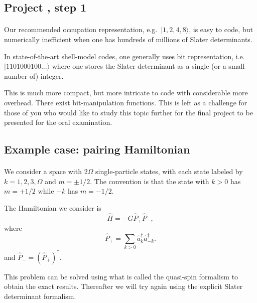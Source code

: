 \documentclass[%
twoside,                 %
final,                   %
10pt]{article}
\begin{document}
\subsection{Project , step 1}

\paragraph{}

Our recommended occupation representation, e.g.~$| 1,2,4,8 \rangle$, is 
easy to code, but numerically inefficient when one has hundreds of 
millions of Slater determinants.


In state-of-the-art shell-model codes, one generally uses bit 
representation, i.e.~$|1101000100... \rangle$ where one stores 
the Slater determinant as a single (or a small number of) integer.


This is much more compact, but more intricate to code with considerable 
more overhead. There exist 
bit-manipulation functions. 
This is left as a challenge for those of you who would like to study this topic further for the final project to be presented for the oral examination.



\subsection{Example case: pairing Hamiltonian}

\paragraph{}

We consider a space with $2\Omega$ single-particle states, with each 
state labeled by 
$k = 1, 2, 3, \Omega$ and $m = \pm 1/2$. The convention is that 
the state with $k>0$ has $m = + 1/2$ while $-k$ has $m = -1/2$.


The Hamiltonian we consider is 
\[
\hat{H} = -G \hat{P}_+ \hat{P}_-,
\]
where
\[
\hat{P}_+ = \sum_{k > 0} \hat{a}^\dagger_k \hat{a}^\dagger_{-{k}}.
\]
and $\hat{P}_- = ( \hat{P}_+)^\dagger$.

This problem can be solved using what is called the quasi-spin formalism to obtain the 
exact results. Thereafter we will try again using the explicit Slater determinant formalism.
\end{document}
